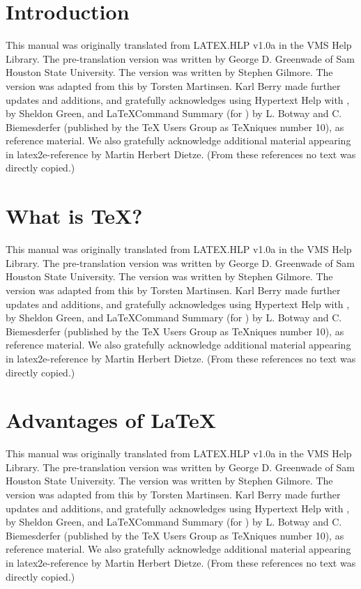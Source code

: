 \documentclass{article}
\begin{document}
	\section{Introduction}
		This manual was originally translated from LATEX.HLP v1.0a in the VMS Help Library.  The pre-translation version was written by George D. Greenwade of Sam Houston State University.  The  version was written by Stephen Gilmore.  The \LaTeXe version was adapted from this by Torsten Martinsen.  Karl Berry made further updates and additions, and gratefully acknowledges using Hypertext Help with \LaTeXe, by Sheldon Green, and \LaTeX Command Summary (for ) by L. Botway and C. Biemesderfer (published by the TeX Users Group as TeXniques number 10), as reference material.  We also gratefully acknowledge additional material appearing in latex2e-reference by Martin Herbert Dietze.  (From these references no text was directly copied.)
	
	\section{What is \TeX?}
		This manual was originally translated from LATEX.HLP v1.0a in the VMS Help Library.  The pre-translation version was written by George D. Greenwade of Sam Houston State University.  The  version was written by Stephen Gilmore.  The \LaTeXe version was adapted from this by Torsten Martinsen.  Karl Berry made further updates and additions, and gratefully acknowledges using Hypertext Help with \LaTeXe, by Sheldon Green, and \LaTeX Command Summary (for ) by L. Botway and C. Biemesderfer (published by the TeX Users Group as TeXniques number 10), as reference material.  We also gratefully acknowledge additional material appearing in latex2e-reference by Martin Herbert Dietze.  (From these references no text was directly copied.)
	
	\section{Advantages of \LaTeX}
		This manual was originally translated from LATEX.HLP v1.0a in the VMS Help Library.  The pre-translation version was written by George D. Greenwade of Sam Houston State University.  The  version was written by Stephen Gilmore.  The \LaTeXe version was adapted from this by Torsten Martinsen.  Karl Berry made further updates and additions, and gratefully acknowledges using Hypertext Help with \LaTeXe, by Sheldon Green, and \LaTeX Command Summary (for ) by L. Botway and C. Biemesderfer (published by the TeX Users Group as TeXniques number 10), as reference material.  We also gratefully acknowledge additional material appearing in latex2e-reference by Martin Herbert Dietze.  (From these references no text was directly copied.)
	
\end{document}
